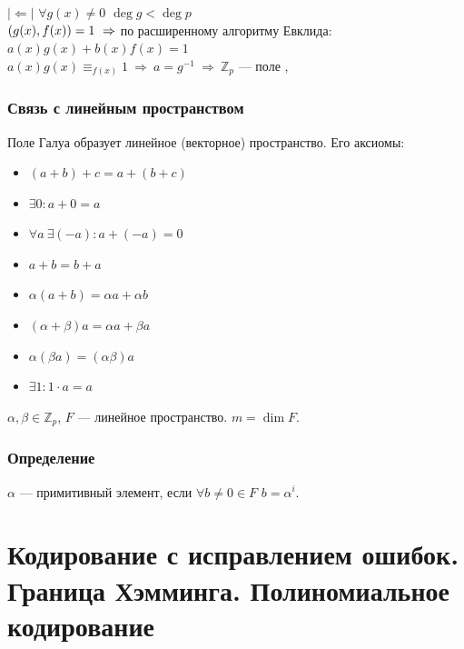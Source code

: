 \documentclass[12pt]{article}
\let\gcd\relax
\DeclareMathOperator{\gcd}{НОД}
\begin{document}
$|\Leftarrow|$ $\forall g(x) \neq 0$ $\deg g < \deg p$ \\
$\gcd(g(x), f(x)) = 1\ \Rightarrow$ по расширенному алгоритму Евклида:\\
$a(x)g(x) + b(x)f(x) = 1$ \\
$a(x)g(x) \equiv_{f(x)} 1\ \Rightarrow\ a = g^{-1} \ \Rightarrow\ \mathbb{Z}_p$ — поле
,
\subsubsection{Связь с линейным пространством}
Поле Галуа образует линейное (векторное) пространство. Его аксиомы:
\begin{itemize}
    \item $(a + b) + c = a + (b + c)$
    \item $\exists 0 : a + 0 = a$
    \item $\forall a \  \exists(-a) : a + (-a) = 0$
    \item $a + b = b + a$
    \item $\alpha(a + b) = \alpha a + \alpha b$
    \item $(\alpha + \beta)a = \alpha a + \beta a$
    \item $\alpha(\beta a) = (\alpha \beta) a$
    \item $\exists 1 : 1 \cdot a = a$
\end{itemize}

$\alpha, \beta \in \mathbb{Z}_p$, $F$ — линейное пространство. $m = \dim F$.

\subsubsection{Определение}
$\alpha$ — примитивный элемент, если $\forall b \neq 0 \in F$ \qquad $b = \alpha^i$.

\section{Кодирование с исправлением ошибок. Граница Хэмминга. Полиномиальное кодирование}
\end{document}
